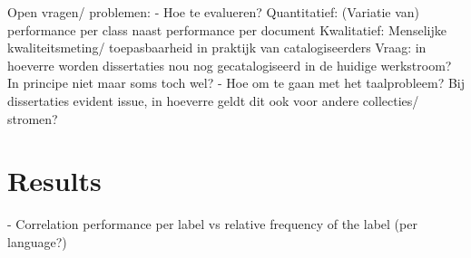 \documentclass{article}
\begin{document}
Open vragen/ problemen:
- Hoe te evalueren? 
  Quantitatief: (Variatie van) performance per class naast performance per document
  Kwalitatief:  Menselijke kwaliteitsmeting/ toepasbaarheid in praktijk van catalogiseerders
                Vraag: in hoeverre worden dissertaties nou nog gecatalogiseerd in de huidige werkstroom? In principe niet maar soms toch wel?
- Hoe om te gaan met het taalprobleem? 
  Bij dissertaties evident issue, in hoeverre geldt dit ook voor andere collecties/ stromen?

\section{Results}

- Correlation performance per label vs relative frequency of the label (per language?)
\end{document}
